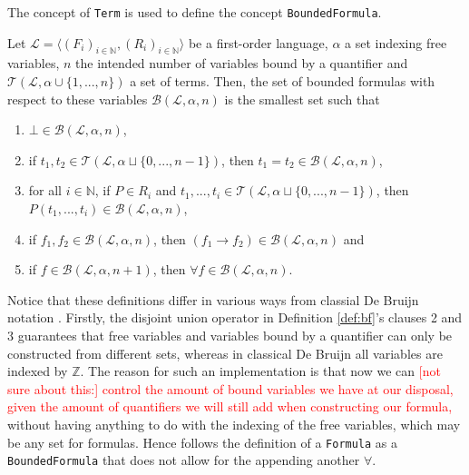 The concept of \texttt{Term} is used to define the concept \texttt{BoundedFormula}.

\begin{definition}[BoundedFormula]\label{def:bf}
    Let $\mathcal{L} = \langle (F_i)_{i \in \mathbb{N}}, (R_i)_{i \in \mathbb{N}} \rangle$ be a first-order language, $\alpha$ a set indexing free variables, $n$ the intended number of variables bound by a quantifier and $\mathcal{T}(\mathcal{L}, \alpha \cup \{1,...,n\})$ a set of terms. Then, the set of bounded formulas with respect to these variables $\mathcal{B}(\mathcal{L},\alpha,n)$ is the smallest set such that
    \begin{enumerate}
        \item $\bot \in \mathcal{B}(\mathcal{L},\alpha,n)$,
        \item if $t_1,t_2 \in \mathcal{T}(\mathcal{L}, \alpha \sqcup \{0,...,n-1\})$, then $t_1 = t_2 \in \mathcal{B}(\mathcal{L},\alpha,n)$,
        \item for all $i \in \mathbb{N}$, if $P \in R_i$ and $t_1,...,t_i \in \mathcal{T}(\mathcal{L}, \alpha \sqcup \{0,...,n-1\})$, then $P(t_1,...,t_i) \in \mathcal{B}(\mathcal{L},\alpha,n)$,
        \item if $f_1,f_2 \in \mathcal{B}(\mathcal{L},\alpha,n)$, then $(f_1 \rightarrow f_2) \in \mathcal{B}(\mathcal{L},\alpha,n)$ and
        \item if $f \in \mathcal{B}(\mathcal{L},\alpha,n+1)$, then $\forall f \in \mathcal{B}(\mathcal{L},\alpha,n)$.
    \end{enumerate}
\end{definition}

Notice that these definitions differ in various ways from classial De Bruijn notation \cite{bruijn:1972}. Firstly, the disjoint union operator in Definition \ref{def:bf}'s clauses 2 and 3 guarantees that free variables and variables bound by a quantifier can only be constructed from different sets, whereas in classical De Bruijn all variables are indexed by $\mathbb{Z}$. The reason for such an implementation is that now we can \textcolor{red}{[not sure about this:] control the amount of bound variables we have at our disposal, given the amount of quantifiers we will still add when constructing our formula,} without having anything to do with the indexing of the free variables, which may be any set for formulas. Hence follows the definition of a \texttt{Formula} as a \texttt{BoundedFormula} that does not allow for the appending another $\forall$.


